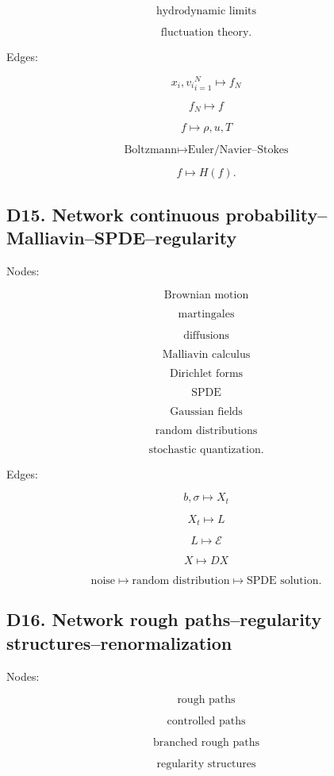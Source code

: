 \documentclass[11pt]{article}
\begin{document}
\[
\text{hydrodynamic limits}
\]

\[
\text{fluctuation theory}.
\]

Edges:

\[
{x_i,v_i}_{i=1}^N\mapsto f_N
\]

\[
f_N\mapsto f
\]

\[
f\mapsto \rho,u,T
\]

\[
\text{Boltzmann}\mapsto \text{Euler/Navier--Stokes}
\]

\[
f\mapsto H(f).
\]



\subsection{D15. Network continuous probability--Malliavin--SPDE--regularity}

Nodes:

\[
\text{Brownian motion}
\]

\[
\text{martingales}
\]

\[
\text{diffusions}
\]

\[
\text{Malliavin calculus}
\]

\[
\text{Dirichlet forms}
\]

\[
\text{SPDE}
\]

\[
\text{Gaussian fields}
\]

\[
\text{random distributions}
\]

\[
\text{stochastic quantization}.
\]

Edges:

\[
b,\sigma\mapsto X_t
\]

\[
X_t\mapsto L
\]

\[
L\mapsto \mathcal E
\]

\[
X\mapsto DX
\]

\[
\text{noise}\mapsto \text{random distribution}\mapsto \text{SPDE solution}.
\]



\subsection{D16. Network rough paths--regularity structures--renormalization}

Nodes:

\[
\text{rough paths}
\]

\[
\text{controlled paths}
\]

\[
\text{branched rough paths}
\]

\[
\text{regularity structures}
\]
\end{document}
